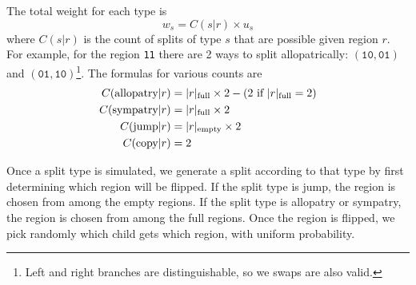 \documentclass{article}
\begin{document}
The total weight for each type is
\begin{equation}
  w_s = C(s|r) \times u_s
\end{equation}
where $C(s|r)$ is the count of splits of type $s$ that are possible given region $r$. For example, for the region
\texttt{11} there are 2 ways to split allopatrically: $(\texttt{10}, \texttt{01})$ and $(\texttt{01},
  \texttt{10})$\footnote{Left and right branches are distinguishable, so we swaps are also valid.}\footnotemark.
The formulas for various counts are
\begin{align*}
  C(\text{allopatry}|r) & = |r|_\text{full} \times 2 - (2 \text{ if } |r|_\text{full} = 2) \\
  C(\text{sympatry}|r)  & = |r|_\text{full} \times 2                                     \\
  C(\text{jump}|r)      & = |r|_\text{empty} \times 2                                    \\
  C(\text{copy}|r)      & = 2                                                          \\
\end{align*}


Once a split type is simulated, we generate a split according to that type by first determining which region will
be flipped\footnotemark.
If the split type is jump, the region is chosen from among the empty regions.
If the split type is allopatry or sympatry, the region is chosen from among the full regions.
Once the region is flipped, we pick randomly which child gets which region, with uniform probability.

\end{document}

